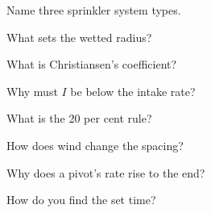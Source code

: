 \begin{exlist}
\item Name three sprinkler system types.
\item What sets the wetted radius?
\item What is Christiansen's coefficient?
\item Why must $I$ be below the intake rate?
\item What is the 20 per cent rule?
\item How does wind change the spacing?
\item Why does a pivot's rate rise to the end?
\item How do you find the set time?
\end{exlist}
